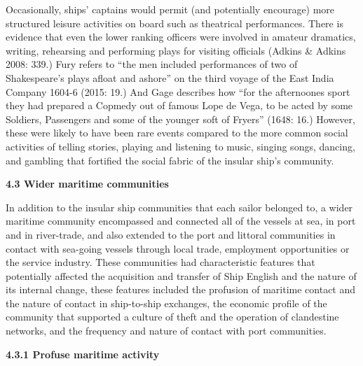 \begin{styleStandard}
Occasionally, ships’ captains would permit (and potentially encourage) more structured leisure activities on board such as theatrical performances. There is evidence that even the lower ranking officers were involved in amateur dramatics, writing, rehearsing and performing plays for visiting officials (Adkins \& Adkins 2008: 339.) Fury refers to “the men included performances of two of Shakespeare’s plays afloat and ashore” on the third voyage of the East India Company 1604-6 (2015: 19.) And Gage describes how “for the afternoones sport they had prepared a Copmedy out of famous Lope de Vega, to be acted by some Soldiers, Passengers and some of the younger soft of Fryers” (1648: 16.) However, these were likely to have been rare events compared to the more common social activities of telling stories, playing and listening to music, singing songs, dancing, and gambling that fortified the social fabric of the insular ship’s community. 
\end{styleStandard}


\begin{styleStandard}
\textbf{4.3 Wider maritime communities}
\end{styleStandard}


\begin{styleStandard}
In addition to the insular ship communities that each sailor belonged to, a wider maritime community encompassed and connected all of the vessels at sea, in port and in river-trade, and also extended to the port and littoral communities in contact with sea-going vessels through local trade, employment opportunities or the service industry. These communities had characteristic features that potentially affected the acquisition and transfer of Ship English and the nature of its internal change, these features included the profusion of maritime contact and the nature of contact in ship-to-ship exchanges, the economic profile of the community that supported a culture of theft and the operation of clandestine networks, and the frequency and nature of contact with port communities. 
\end{styleStandard}


\begin{styleStandard}
\textbf{4.3.1 Profuse maritime activity}
\end{styleStandard}


